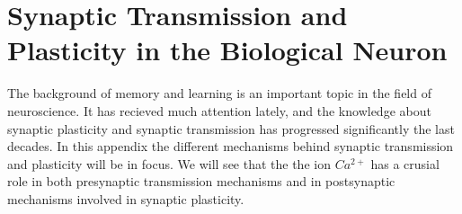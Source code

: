 

% 
%
%








\appendix
\chapter{Synaptic Transmission and Plasticity in the Biological Neuron} %



\label{appendixSynPlast}

The background of memory and learning is an important topic in the field of neuroscience. 
It has recieved much attention lately, and the knowledge about synaptic plasticity and synaptic transmission has progressed significantly the last decades.
In this appendix the different mechanisms behind synaptic transmission and plasticity will be in focus.
We will see that the the ion $Ca^{2+}$ has a crusial role in both presynaptic transmission mechanisms and in postsynaptic mechanisms involved in synaptic plasticity.



